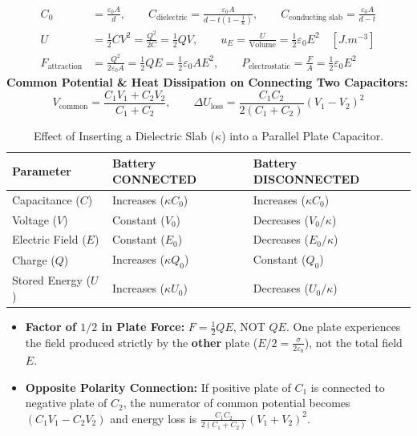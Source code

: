 \documentclass[10pt,twoside,openright]{book}
\begin{document}
\begin{formulabox}
\begin{align}
  C_0 &= \frac{\varepsilon_0 A}{d}, \qquad C_{\text{dielectric}} = \frac{\varepsilon_0 A}{d - t\left(1 - \frac{1}{\kappa}\right)}, \qquad C_{\text{conducting slab}} = \frac{\varepsilon_0 A}{d - t} \\
  U &= \frac{1}{2}CV^2 = \frac{Q^2}{2C} = \frac{1}{2}QV, \qquad u_E = \frac{U}{\text{Volume}} = \frac{1}{2}\varepsilon_0 E^2 \quad [\si{J.m^{-3}}] \\
  F_{\text{attraction}} &= \frac{Q^2}{2\varepsilon_0 A} = \frac{1}{2}QE = \frac{1}{2}\varepsilon_0 A E^2, \qquad P_{\text{electrostatic}} = \frac{F}{A} = \frac{1}{2}\varepsilon_0 E^2
\end{align}
\textbf{Common Potential \& Heat Dissipation on Connecting Two Capacitors:}
\begin{equation}
  V_{\text{common}} = \frac{C_1 V_1 + C_2 V_2}{C_1 + C_2}, \qquad \Delta U_{\text{loss}} = \frac{C_1 C_2}{2(C_1 + C_2)}(V_1 - V_2)^2
\end{equation}
\end{formulabox}

\begin{table}[htbp]
\centering
\footnotesize
\setlength{\tabcolsep}{3pt}
\renewcommand{\arraystretch}{1.2}
\begin{tabularx}{\textwidth}{L Y Y}
\toprule
\textbf{Parameter} & \textbf{Battery CONNECTED} & \textbf{Battery DISCONNECTED} \\
\midrule
Capacitance ($C$) & Increases ($\kappa C_0$) & Increases ($\kappa C_0$) \\
Voltage ($V$) & Constant ($V_0$) & Decreases ($V_0/\kappa$) \\
Electric Field ($E$) & Constant ($E_0$) & Decreases ($E_0/\kappa$) \\
Charge ($Q$) & Increases ($\kappa Q_0$) & Constant ($Q_0$) \\
Stored Energy ($U$) & Increases ($\kappa U_0$) & Decreases ($U_0/\kappa$) \\
\bottomrule
\end{tabularx}
\caption{Effect of Inserting a Dielectric Slab ($\kappa$) into a Parallel Plate Capacitor.}
\end{table}

\begin{trapbox}
\begin{itemize}
  \item \textbf{Factor of $1/2$ in Plate Force:} $F = \frac{1}{2}QE$, NOT $QE$. One plate experiences the field produced strictly by the \textbf{other} plate ($E/2 = \frac{\sigma}{2\varepsilon_0}$), not the total field $E$.
  \item \textbf{Opposite Polarity Connection:} If positive plate of $C_1$ is connected to negative plate of $C_2$, the numerator of common potential becomes $(C_1 V_1 - C_2 V_2)$ and energy loss is $\frac{C_1 C_2}{2(C_1 + C_2)}(V_1 + V_2)^2$.
\end{itemize}
\end{trapbox}
\end{document}
